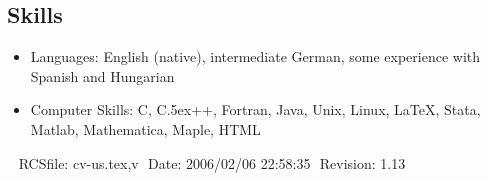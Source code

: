 \documentclass[overlapped,line,draft,11pt,letterpaper]{res}
\def\Cplusplus{{\rm C\raise.5ex\hbox{\small ++}}}
\begin{document}
\begin{resume}

\section{\bf Skills}
\begin{itemize}
\item Languages: English (native), intermediate German,
  some experience with Spanish and Hungarian
\item Computer Skills: C, \Cplusplus, Fortran, Java, Unix, Linux, \LaTeX,
  Stata, Matlab, Mathematica, Maple, HTML
\end{itemize}


\begin{center}
\vspace{\fill}\ \newline
{\tiny \rm $ $RCSfile: cv-us.tex,v $ $ }
{\tiny \rm $ $Date: 2006/02/06 22:58:35 $ $ }
{\tiny \rm $ $Revision: 1.13 $ $ }
\end{center}

\end{resume}
\end{document}
